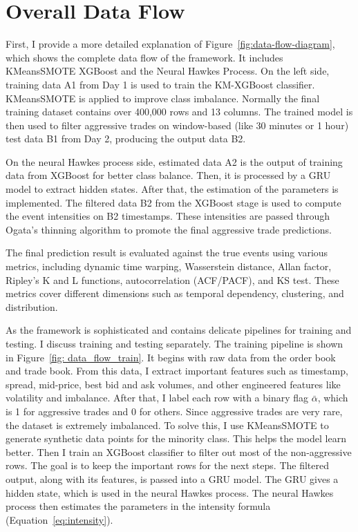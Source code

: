 \section{Overall Data Flow} \label{sec:data-flow}
First, I provide a more detailed explanation of Figure~\ref{fig:data-flow-diagram}, which shows the complete data flow of the framework. It includes KMeansSMOTE XGBoost and the Neural Hawkes Process. On the left side, training data A1 from Day 1 is used to train the KM-XGBoost classifier. KMeansSMOTE is applied to improve class imbalance. Normally the final training dataset contains over 400,000 rows and 13 columns. The trained model is then used to filter aggressive trades on window-based (like 30 minutes or 1 hour) test data B1 from Day 2, producing the output data B2.

On the neural Hawkes process side, estimated data A2 is the output of training data from XGBoost for better class balance. Then, it is processed by a GRU model to extract hidden states. After that, the estimation of the parameters is implemented. The filtered data B2 from the XGBoost stage is used to compute the event intensities on B2 timestamps. These intensities are passed through Ogata's thinning algorithm to promote the final aggressive trade predictions.

The final prediction result is evaluated against the true events using various metrics, including dynamic time warping, Wasserstein distance, Allan factor, Ripley's K and L functions, autocorrelation (ACF/PACF), and KS test. These metrics cover different dimensions such as temporal dependency, clustering, and distribution.

As the framework is sophisticated and contains delicate pipelines for training and testing. I discuss training and testing separately. The training pipeline is shown in Figure~\ref{fig: data_flow_train}. It begins with raw data from the order book and trade book. From this data, I extract important features such as timestamp, spread, mid-price, best bid and ask volumes, and other engineered features like volatility and imbalance. After that, I label each row with a binary flag $\bar{\alpha}$, which is 1 for aggressive trades and 0 for others. Since aggressive trades are very rare, the dataset is extremely imbalanced. To solve this, I use KMeansSMOTE to generate synthetic data points for the minority class. This helps the model learn better. Then I train an XGBoost classifier to filter out most of the non-aggressive rows. The goal is to keep the important rows for the next steps. The filtered output, along with its features, is passed into a GRU model. The GRU gives a hidden state, which is used in the neural Hawkes process. The neural Hawkes process then estimates the parameters in the intensity formula (Equation~\ref{eq:intensity}).

